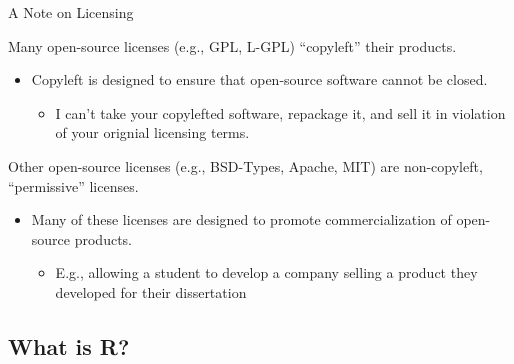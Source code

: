 \documentclass[10pt]{beamer}
\begin{document}
\begin{frame}{A Note on Licensing}

  Many open-source licenses (e.g., GPL, L-GPL) ``copyleft'' their products.
  \vb
  \begin{itemize}
  \item Copyleft is designed to ensure that open-source software cannot be 
    closed.
    \vc
    \begin{itemize}
    \item I can't take your copylefted software, repackage it, and sell it in 
      violation of your orignial licensing terms.
    \end{itemize}
  \end{itemize}
  \va
  Other open-source licenses (e.g., BSD-Types, Apache, MIT) are non-copyleft, 
  ``permissive'' licenses.
  \vb
  \begin{itemize}
  \item Many of these licenses are designed to promote commercialization of 
    open-source products.
    \vc
    \begin{itemize}
    \item E.g., allowing a student to develop a company selling a product they 
      developed for their dissertation
    \end{itemize}
  \end{itemize}
  
\end{frame}




\subsection{What is R?}

\end{document}
